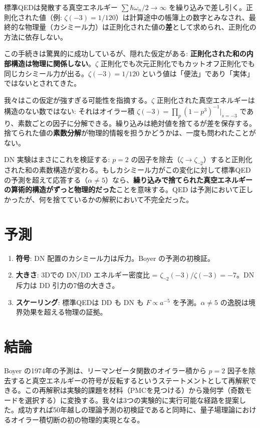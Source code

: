 \documentclass[11pt,a4paper]{article}
\begin{document}
標準QEDは発散する真空エネルギー $\sum \hbar\omega_n/2 \to \infty$ を繰り込みで差し引く。正則化された値（例: $\zeta(-3) = 1/120$）は計算途中の帳簿上の数字とみなされ、最終的な物理量（カシミール力）は正則化された値の\textbf{差}として求められ、正則化の方法に依存しない。

この手続きは驚異的に成功しているが、隠れた仮定がある: \textbf{正則化された和の内部構造は物理に関係しない}。$\zeta$ 正則化でも次元正則化でもカットオフ正則化でも同じカシミール力が出る。$\zeta(-3) = 1/120$ という値は「便法」であり「実体」ではないとされてきた。

我々はこの仮定が強すぎる可能性を指摘する。$\zeta$ 正則化された真空エネルギーは構造のない数ではない: それはオイラー積 $\zeta(-3) = \prod_p (1-p^3)^{-1}|_{s=-3}$ であり、素数ごとの因子に分解できる。繰り込みは絶対値を捨てるが差を保存する。捨てられた値の\textbf{素数分解}が物理的情報を担うかどうかは、一度も問われたことがない。

DN 実験はまさにこれを検証する: $p=2$ の因子を除去（$\zeta \to \zeta_{\neg 2}$）すると正則化された和の素数構造が変わる。もしカシミール力がこの変化に対して標準QEDの予測を超えて応答する（$\alpha \neq 5$）なら、\textbf{繰り込みで捨てられた真空エネルギーの算術的構造がずっと物理的だった}ことを意味する。QED は予測において正しかったが、何を捨てているかの解釈において不完全だった。

\section{予測}

\begin{enumerate}
\item \textbf{符号}: DN 配置のカシミール力は斥力。Boyer の予測の初検証。
\item \textbf{大きさ}: 3Dでの DN/DD エネルギー密度比 = $\zeta_{\neg 2}(-3)/\zeta(-3) = -7$。DN 斥力は DD 引力の7倍の大きさ。
\item \textbf{スケーリング}: 標準QEDは DD も DN も $F \propto a^{-5}$ を予測。$\alpha \neq 5$ の逸脱は境界効果を超える物理の証拠。
\end{enumerate}

\section{結論}

Boyer の1974年の予測は、リーマンゼータ関数のオイラー積から $p=2$ 因子を除去すると真空エネルギーの符号が反転するというステートメントとして再解釈できる。この再解釈は実験的課題を材料（PMCを見つける）から幾何学（奇数モードを選択する）に変換する。我々は3つの実験的に実行可能な経路を提案した。成功すれば50年越しの理論予測の初検証であると同時に、量子場理論におけるオイラー積切断の初の物理的実現となる。
\end{document}
